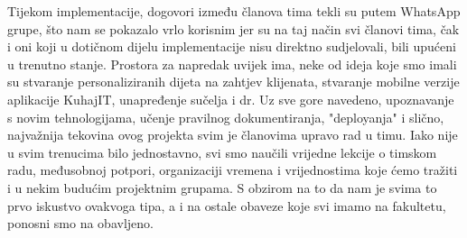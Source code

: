 		Tijekom implementacije, dogovori između članova tima tekli su putem WhatsApp grupe, što nam se pokazalo vrlo korisnim jer su na taj način svi članovi tima, čak i oni koji u dotičnom dijelu implementacije nisu direktno sudjelovali, bili upućeni u trenutno stanje.
		Prostora za napredak uvijek ima, neke od ideja koje smo imali su stvaranje personaliziranih dijeta na zahtjev klijenata, stvaranje mobilne verzije aplikacije KuhajIT, unapređenje sučelja i dr.
		Uz sve gore navedeno, upoznavanje s novim tehnologijama, učenje pravilnog dokumentiranja, "deployanja" i slično, najvažnija tekovina ovog projekta svim je članovima upravo rad u timu. Iako nije u svim trenucima bilo jednostavno, svi smo naučili vrijedne lekcije o timskom radu, međusobnoj potpori, organizaciji vremena i vrijednostima koje ćemo tražiti i u nekim budućim projektnim grupama.
		S obzirom na to da nam je svima to prvo iskustvo ovakvoga tipa, a i na ostale obaveze koje svi imamo na fakultetu, ponosni smo na obavljeno.
				\eject 